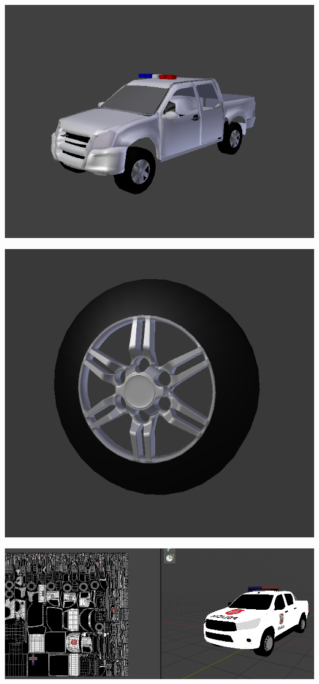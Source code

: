 \documentclass{article}
\begin{document}
  \includegraphics[width=\textwidth]{11.png}

  \includegraphics[width=\textwidth]{14.png}

  \includegraphics[width=\textwidth]{33.png}
\end{document}
